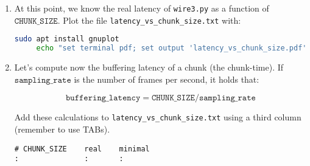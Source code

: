 \begin{enumerate}
\begin{enumerate}
  \item Use the
    \href{https://manual.audacityteam.org/man/edit_toolbar.html#zoom_to_selection}{zoom
      to selection buttom} to zoom-in the selected area.

  \item Measure the time between the ocurrence of the sound and
    it's first replica. This time is the real latency of your computer
    runing \texttt{wire3.py}.

  \item Modify the constant $\mathtt{CHUNK\_SIZE}$ and repeat this
    process, starting at the Step \ref{start_point}. Create an ASCII
    file (\texttt{latency\_vs\_chunk\_size.txt}) with the content (use
    tabulators to space the columns):
\begin{verbatim}
# CHUNK_SIZE    real
32              ...
64              ...
128             ...
256             ...
512             ...
1024            ...
2048            ...
4096            ...
8192            ...
\end{verbatim}

  \end{enumerate}

\item At this point, we know the real latency of \texttt{wire3.py} as
  a function of $\mathtt{CHUNK\_SIZE}$. Plot the file
  \texttt{latency\_vs\_chunk\_size.txt} with:

  \begin{lstlisting}[language=Bash]
     sudo apt install gnuplot
     echo "set terminal pdf; set output 'latency_vs_chunk_size.pdf'; set xlabel 'CHUNK\_SIZE (frames)'; set ylabel 'Latency (seconds)'; plot 'latency_vs_chunk_size.txt' title '' with linespoints" | gnuplot
  \end{lstlisting}

\item Let's compute now the buffering latency of a chunk (the chunk-time). If
  $\mathtt{sampling\_rate}$ is the number of frames per second, it holds
  that:
  
  \begin{equation}
    \mathtt{buffering\_latency} = \mathtt{CHUNK\_SIZE} / \mathtt{sampling\_rate}
  \end{equation}

  Add these calculations to \texttt{latency\_vs\_chunk\_size.txt} using
  a third column (remember to use TABs).
\begin{verbatim}
# CHUNK_SIZE    real    minimal
:               :       :
\end{verbatim}


\end{enumerate}
